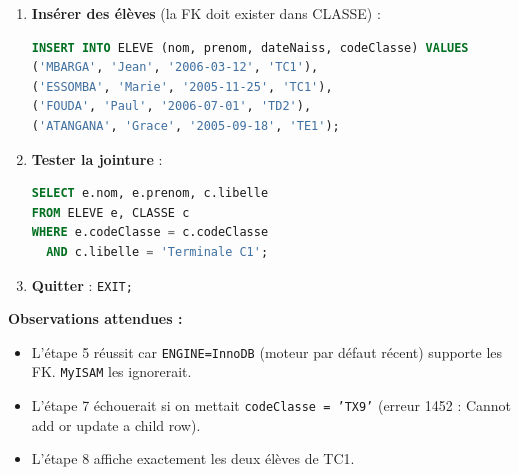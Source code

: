 \documentclass[11pt]{article}
\begin{document}
\begin{experience}
\begin{enumerate}
\begin{lstlisting}[language=SQL]
INSERT INTO CLASSE (codeClasse, libelle, effectifMax) VALUES
('TC1', 'Terminale C1', 55),
('TD2', 'Terminale D2', 50),
('TE1', 'Terminale E1', 45);
\end{lstlisting}
\item \textbf{Insérer des élèves} (la FK doit exister dans CLASSE) :
\begin{lstlisting}[language=SQL]
INSERT INTO ELEVE (nom, prenom, dateNaiss, codeClasse) VALUES
('MBARGA', 'Jean', '2006-03-12', 'TC1'),
('ESSOMBA', 'Marie', '2005-11-25', 'TC1'),
('FOUDA', 'Paul', '2006-07-01', 'TD2'),
('ATANGANA', 'Grace', '2005-09-18', 'TE1');
\end{lstlisting}
\item \textbf{Tester la jointure} :
\begin{lstlisting}[language=SQL]
SELECT e.nom, e.prenom, c.libelle
FROM ELEVE e, CLASSE c
WHERE e.codeClasse = c.codeClasse
  AND c.libelle = 'Terminale C1';
\end{lstlisting}
\item \textbf{Quitter} : \texttt{EXIT;}
\end{enumerate}

\textbf{Observations attendues :}
\begin{itemize}
\item L'étape 5 réussit car \texttt{ENGINE=InnoDB} (moteur par défaut récent) supporte les FK. \texttt{MyISAM} les ignorerait.
\item L'étape 7 échouerait si on mettait \texttt{codeClasse = 'TX9'} (erreur 1452 : Cannot add or update a child row).
\item L'étape 8 affiche exactement les deux élèves de TC1.
\end{itemize}
\end{experience}
\end{document}
